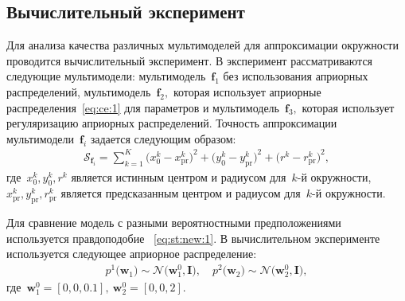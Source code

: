 \subsection{Вычислительный эксперимент}
Для анализа качества различных мультимоделей для аппроксимации окружности проводится вычислительный эксперимент.
В эксперимент рассматриваются следующие мультимодели: мультимодель~$\textbf{f}_1$ без использования априорных распределений, мультимодель~$\textbf{f}_2,$ которая использует априорные распределения~\eqref{eq:ce:1} для параметров и мультимодель~$\textbf{f}_3,$ которая использует регуляризацию априорных распределений.
Точность аппроксимации мультимодели~$\textbf{f}_i$ задается следующим образом:
\[
\label{eq:ce:ex:0:1}
\begin{aligned}
\mathcal{S}_{\textbf{f}_i} = \sum_{k=1}^{K}\bigr(x^{k}_{0}-x^{k}_{\text{pr}}\bigr)^2+\bigr(y^{k}_{0}-y^{k}_{\text{pr}}\bigr)^2+\bigr(r^{k}-r^{k}_{\text{pr}}\bigr)^2,
\end{aligned}
\]
где~$x^{k}_0, y^{k}_0, r^{k}$ является истинным центром и радиусом для~$k$-й окружности,~$x^{k}_{\text{pr}}, y^{k}_{\text{pr}}, r^{k}_{\text{pr}}$ является предсказанным центром и радиусом для~$k$-й окружности.

Для сравнение модель с разными вероятностными предположениями используется правдоподобие ~\eqref{eq:st:new:1}.
В вычислительном эксперименте используется следующее априорное распределение:
\[
\label{eq:ce:1}
\begin{aligned}
p^{1}\bigr(\textbf{w}_1\bigr)\sim\mathcal{N}\bigr(\textbf{w}^{0}_{1}, \textbf{I}\bigr), \quad p^{2}\bigr(\textbf{w}_2\bigr)\sim\mathcal{N}\bigr(\textbf{w}^{0}_{2}, \textbf{I}\bigr),
\end{aligned}
\]
где~$\textbf{w}^{0}_1 = [0, 0, 0.1],\ \textbf{w}^{0}_2 = [0, 0, 2]$.

